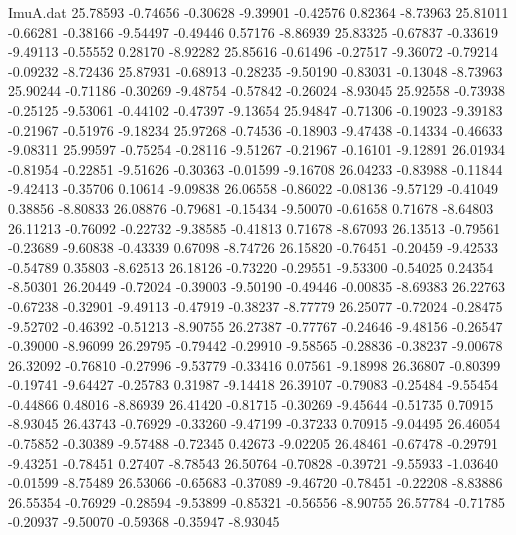 \begin{filecontents}{ImuA.dat}
  25.78593   -0.74656   -0.30628   -9.39901   -0.42576    0.82364   -8.73963
  25.81011   -0.66281   -0.38166   -9.54497   -0.49446    0.57176   -8.86939
  25.83325   -0.67837   -0.33619   -9.49113   -0.55552    0.28170   -8.92282
  25.85616   -0.61496   -0.27517   -9.36072   -0.79214   -0.09232   -8.72436
  25.87931   -0.68913   -0.28235   -9.50190   -0.83031   -0.13048   -8.73963
  25.90244   -0.71186   -0.30269   -9.48754   -0.57842   -0.26024   -8.93045
  25.92558   -0.73938   -0.25125   -9.53061   -0.44102   -0.47397   -9.13654
  25.94847   -0.71306   -0.19023   -9.39183   -0.21967   -0.51976   -9.18234
  25.97268   -0.74536   -0.18903   -9.47438   -0.14334   -0.46633   -9.08311
  25.99597   -0.75254   -0.28116   -9.51267   -0.21967   -0.16101   -9.12891
  26.01934   -0.81954   -0.22851   -9.51626   -0.30363   -0.01599   -9.16708
  26.04233   -0.83988   -0.11844   -9.42413   -0.35706    0.10614   -9.09838
  26.06558   -0.86022   -0.08136   -9.57129   -0.41049    0.38856   -8.80833
  26.08876   -0.79681   -0.15434   -9.50070   -0.61658    0.71678   -8.64803
  26.11213   -0.76092   -0.22732   -9.38585   -0.41813    0.71678   -8.67093
  26.13513   -0.79561   -0.23689   -9.60838   -0.43339    0.67098   -8.74726
  26.15820   -0.76451   -0.20459   -9.42533   -0.54789    0.35803   -8.62513
  26.18126   -0.73220   -0.29551   -9.53300   -0.54025    0.24354   -8.50301
  26.20449   -0.72024   -0.39003   -9.50190   -0.49446   -0.00835   -8.69383
  26.22763   -0.67238   -0.32901   -9.49113   -0.47919   -0.38237   -8.77779
  26.25077   -0.72024   -0.28475   -9.52702   -0.46392   -0.51213   -8.90755
  26.27387   -0.77767   -0.24646   -9.48156   -0.26547   -0.39000   -8.96099
  26.29795   -0.79442   -0.29910   -9.58565   -0.28836   -0.38237   -9.00678
  26.32092   -0.76810   -0.27996   -9.53779   -0.33416    0.07561   -9.18998
  26.36807   -0.80399   -0.19741   -9.64427   -0.25783    0.31987   -9.14418
  26.39107   -0.79083   -0.25484   -9.55454   -0.44866    0.48016   -8.86939
  26.41420   -0.81715   -0.30269   -9.45644   -0.51735    0.70915   -8.93045
  26.43743   -0.76929   -0.33260   -9.47199   -0.37233    0.70915   -9.04495
  26.46054   -0.75852   -0.30389   -9.57488   -0.72345    0.42673   -9.02205
  26.48461   -0.67478   -0.29791   -9.43251   -0.78451    0.27407   -8.78543
  26.50764   -0.70828   -0.39721   -9.55933   -1.03640   -0.01599   -8.75489
  26.53066   -0.65683   -0.37089   -9.46720   -0.78451   -0.22208   -8.83886
  26.55354   -0.76929   -0.28594   -9.53899   -0.85321   -0.56556   -8.90755
  26.57784   -0.71785   -0.20937   -9.50070   -0.59368   -0.35947   -8.93045

\end{filecontents}
